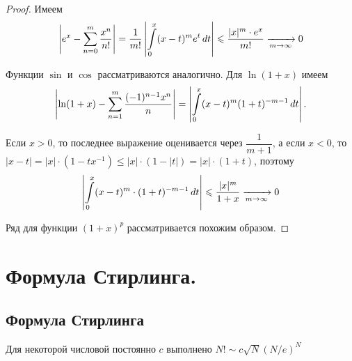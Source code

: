 \documentclass[a4paper]{article}
\theoremstyle{named}
\renewcommand{\int}{\intop}
\begin{document}
    	\begin{proof}
    		Имеем
    		\begin{equation*}
    			\left|e^x - \sum_{n = 0}^m \dfrac{x^n}{n!}\right|
    			= \dfrac{1}{m!} \left|\int_0^x (x - t)^m e^t \dd t\right|
    			\leq \dfrac{|x|^m \cdot e^x}{m!} \xrightarrow[m \to \infty]{} 0
    		\end{equation*}

    		Функции $\sin$ и $\cos$ рассматриваются аналогично. Для $\ln(1 + x)$ имеем
    		\begin{equation*}
    			\left|\ln(1 + x) - \sum_{n = 1}^m \dfrac{(-1)^{n - 1}x^n}{n}\right| = \left|\int_0^x(x - t)^m (1 + t)^{-m - 1} \dd t\right|.
    		\end{equation*}

    		Если $x > 0$, то последнее выражение оценивается через $\dfrac{1}{m + 1}$, а если $x < 0$, то $|x - t| = |x| \cdot (1 - tx^{-1}) \leq |x| \cdot (1 - |t|) = |x| \cdot (1 + t)$, поэтому
    		\begin{equation*}
    			\left|\int_0^x (x - t)^m \cdot (1 + t)^{-m - 1} \dd t\right| \leq \dfrac{|x|^m}{1 + x} \xrightarrow[m \to \infty]{} 0
    		\end{equation*}

    		Ряд для функции $(1 + x)^p$ рассматривается похожим образом.
    	\end{proof}

    \section{Формула Стирлинга.}

   		\subsection{Формула Стирлинга}

   		\begin{theorem*}
   			Для некоторой числовой постоянно $c$ выполнено $N! \sim c \sqrt{N} (N / e)^N$
   		\end{theorem*}
\end{document}
